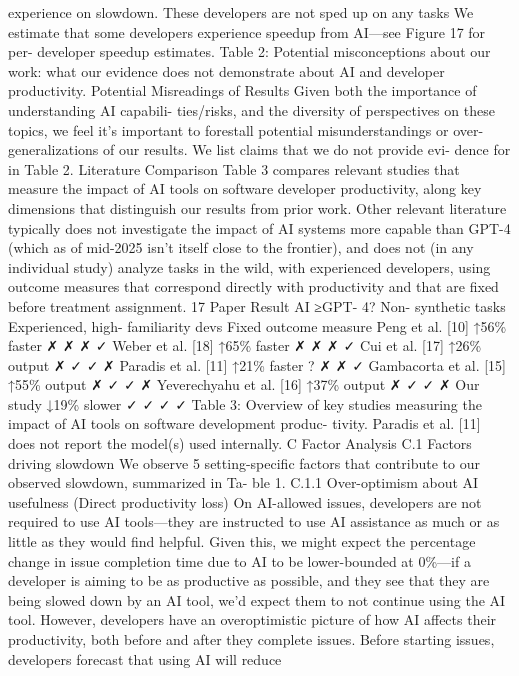 experience on slowdown.
These developers are not sped up on any
tasks
We estimate that some developers experience
speedup
from
AI—see
Figure
17
for
per-
developer speedup estimates.
Table 2: Potential misconceptions about our work: what our evidence does not demonstrate about
AI and developer productivity.
Potential Misreadings of Results
Given both the importance of understanding AI capabili-
ties/risks, and the diversity of perspectives on these topics, we feel it’s important to forestall potential
misunderstandings or over-generalizations of our results. We list claims that we do not provide evi-
dence for in Table 2.
Literature Comparison
Table 3 compares relevant studies that measure the impact of AI tools on
software developer productivity, along key dimensions that distinguish our results from prior work.
Other relevant literature typically does not investigate the impact of AI systems more capable than
GPT-4 (which as of mid-2025 isn’t itself close to the frontier), and does not (in any individual study)
analyze tasks in the wild, with experienced developers, using outcome measures that correspond
directly with productivity and that are fixed before treatment assignment.
17
Paper
Result
AI ≥GPT-
4?
Non-
synthetic
tasks
Experienced,
high-
familiarity
devs
Fixed
outcome
measure
Peng et al. [10]
↑56\% faster
✗
✗
✗
✓
Weber et al. [18]
↑65\% faster
✗
✗
✗
✓
Cui et al. [17]
↑26\% output
✗
✓
✓
✗
Paradis et al. [11]
↑21\% faster
?
✗
✗
✓
Gambacorta et al. [15]
↑55\% output
✗
✓
✓
✗
Yeverechyahu et al. [16]
↑37\% output
✗
✓
✓
✗
Our study
↓19\% slower
✓
✓
✓
✓
Table 3: Overview of key studies measuring the impact of AI tools on software development produc-
tivity. Paradis et al. [11] does not report the model(s) used internally.
C
Factor Analysis
C.1
Factors driving slowdown
We observe 5 setting-specific factors that contribute to our observed slowdown, summarized in Ta-
ble 1.
C.1.1
Over-optimism about AI usefulness (Direct productivity loss)
On AI-allowed issues, developers are not required to use AI tools—they are instructed to use AI
assistance as much or as little as they would find helpful. Given this, we might expect the percentage
change in issue completion time due to AI to be lower-bounded at 0\%—if a developer is aiming to
be as productive as possible, and they see that they are being slowed down by an AI tool, we’d expect
them to not continue using the AI tool.
However, developers have an overoptimistic picture of how AI affects their productivity, both before
and after they complete issues. Before starting issues, developers forecast that using AI will reduce
